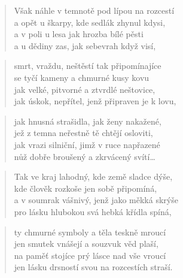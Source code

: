 \documentclass{book}
\begin{document}
\begin{verse}
Však náhle v temnotě pod lípou na rozcestí\\
a opět u škarpy, kde sedlák zhynul kdysi,\\
a v poli u lesa jak hrozba bílé pěsti\\
a u dědiny zas, jak sebevrah když visí,
\end{verse}
\begin{verse}
smrt, vraždu, neštěstí tak připomínajíce\\
se tyčí kameny a chmurné kusy kovu\\
jak velké, pitvorné a ztvrdlé neštovice,\\
jak úskok, nepřítel, jenž připraven je k lovu,
\end{verse}
\begin{verse}
jak hnusná strašidla, jak ženy nakažené,\\
jež z temna neřestně tě chtějí osloviti,\\
jak vrazi silniční, jimž v ruce napřazené\\
nůž dobře broušený a zkrvácený svítí\ldots
\end{verse}
\begin{verse}
Tak ve kraj lahodný, kde země sladce dýše,\\
kde člověk rozkoše jen sobě připomíná,\\
a v soumrak vášnivý, jenž jako měkká skrýše\\
pro lásku hlubokou svá hebká křídla spíná,
\end{verse}
\begin{verse}
ty chmurné symboly a těla teskně mroucí\\
jen smutek vnášejí a souzvuk věd plaší,\\
na paměť stojíce prý lásce nad vše vroucí\\
jen lásku drsností svou na rozcestích straší.
\end{verse}
\end{document}
